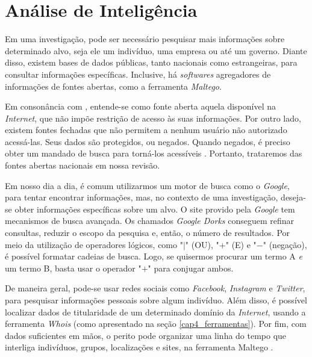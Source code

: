 \section{Análise de Inteligência}
    
    \vspace{10.5cm}
    
    \hspace{1cm}
    Em uma investigação, pode ser necessário pesquisar mais informações sobre determinado alvo, seja ele um indivíduo, uma empresa ou até um governo. Diante disso, existem bases de dados públicas, tanto nacionais como estrangeiras, para consultar informações específicas. Inclusive, há \textit{softwares} agregadores de informações de fontes abertas, como a ferramenta \textit{Maltego}.
    
    \vspace{4mm}
    
    \hspace{1cm}
    Em consonância com , entende-se como fonte aberta aquela disponível na \textit{Internet}, que não impõe restrição de acesso às suas informações. Por outro lado, existem fontes fechadas que não permitem a nenhum usuário não autorizado acessá-las. Seus dados são protegidos, ou negados. Quando negados, é preciso obter um mandado de busca para torná-los acessíveis \cite{barreto2020}. Portanto, trataremos das fontes abertas nacionais em nossa revisão.
        
    \vspace{4mm}
    
    \hspace{1cm}
    Em nosso dia a dia, é comum utilizarmos um motor de busca como o \textit{Google}, para tentar encontrar  informações, mas, no contexto de uma investigação, deseja-se obter informações específicas sobre um alvo. O site provido pela \textit{Google} tem mecanismos de busca avançada. Os chamados \textit{Google Dorks} conseguem refinar consultas, reduzir o escopo da pesquisa e, então, o número de resultados. Por meio da utilização de operadores lógicos, como "$|$" (OU), "$+$" (E) e "$-$" (negação), é possível formatar cadeias de busca. Logo, se quisermos procurar um termo A \textit{e} um termo B, basta usar o operador "$+$" para conjugar ambos.
        
    \vspace{4mm}
    
    \hspace{1cm}
    De maneira geral, pode-se usar redes sociais como \textit{Facebook}, \textit{Instagram} e \textit{Twitter}, para pesquisar informações pessoais sobre algum indivíduo. Além disso, é possível localizar dados de titularidade de um determinado domínio da \textit{Internet}, usando a ferramenta \textit{Whois} (como apresentado na seção \ref{cap4_ferramentas}). Por fim, com dados suficientes em mãos, o perito pode organizar uma linha do tempo que interliga indivíduos, grupos, localizações e sites, na ferramenta Maltego \cite{bazzell2022}.
    
